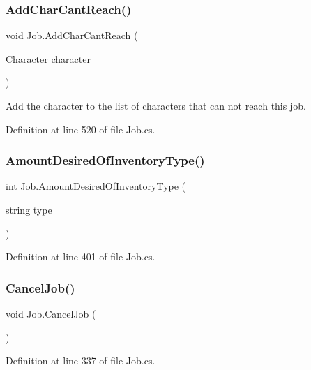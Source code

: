 \subsubsection{\texorpdfstring{Add\+Char\+Cant\+Reach()}{AddCharCantReach()}}
{\footnotesize\ttfamily void Job.\+Add\+Char\+Cant\+Reach (\begin{DoxyParamCaption}\item[{\hyperlink{class_project_porcupine_1_1_entities_1_1_character}{Character}}]{character }\end{DoxyParamCaption})}



Add the character to the list of characters that can not reach this job. 



Definition at line 520 of file Job.\+cs.

\mbox{\label{class_job_a335532dd354ea5a99bbe5c49312689e8}} 
\subsubsection{\texorpdfstring{Amount\+Desired\+Of\+Inventory\+Type()}{AmountDesiredOfInventoryType()}}
{\footnotesize\ttfamily int Job.\+Amount\+Desired\+Of\+Inventory\+Type (\begin{DoxyParamCaption}\item[{string}]{type }\end{DoxyParamCaption})}



Definition at line 401 of file Job.\+cs.

\mbox{\label{class_job_af944847e4846c7e243787d0d4536e1b4}} 
\subsubsection{\texorpdfstring{Cancel\+Job()}{CancelJob()}}
{\footnotesize\ttfamily void Job.\+Cancel\+Job (\begin{DoxyParamCaption}{ }\end{DoxyParamCaption})}



Definition at line 337 of file Job.\+cs.

